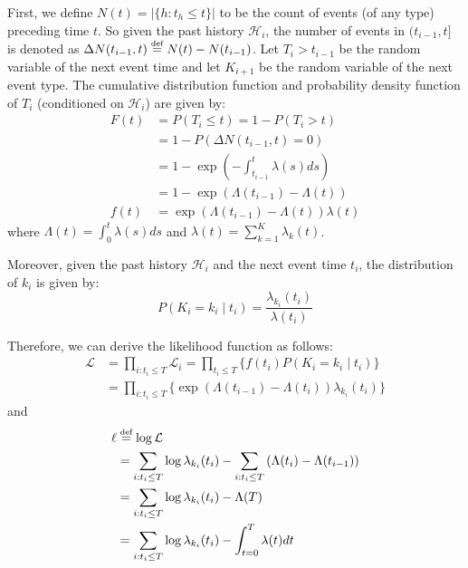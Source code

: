 \documentclass{article}
\newcommand{\defeq}{\mathrel{\stackrel{\mbox{\tiny def}}{=}}} %
\begin{document}
First, we define $N(t) = |\{h: t_h \leq t\}|$ to be the count of events (of any type) preceding time $t$. So given the past history $\mathcal{H}_i$, the number of events in $(t_{i-1},t]$ is denoted as $\Delta N(t_{i-1},t) \defeq N(t)-N(t_{i-1})$.  Let $T_i > t_{i-1}$ be the random variable of the next event time and let $K_{i+1}$ be the random variable of the next event type.  The cumulative distribution function and probability density function of $T_i$ (conditioned on $\mathcal{H}_i$) are given by:
\begin{subequations} \label{eqn:nonhomo_F}
\begin{align}
	F(t)
	&= P(T_i \leq t) = 1-P(T_i > t) \\
	&= 1- P(\Delta N(t_{i-1},t)=0) \\
	&= 1- \exp \left( -\int_{t_{i-1}}^{t} \lambda(s) ds \right) \\
	&= 1- \exp \left( \Lambda(t_{i-1}) - \Lambda(t) \right) \\
	f(t)
	&= \exp \left( \Lambda(t_{i-1}) - \Lambda(t) \right) \lambda(t)
\end{align}
\end{subequations}
where \mbox{$\Lambda(t)=\int_{0}^{t} \lambda(s)ds$} and \mbox{$\lambda(t)=\sum_{k=1}^K \lambda_k(t)$}.

Moreover, given the past history $\mathcal{H}_i$ and the next event time $t_i$, the distribution of $k_i$ is given by:
\begin{equation}
    P(K_i=k_i \mid t_i) = \frac{\lambda_{k_i} (t_i)}{\lambda(t_i)}
\end{equation}

Therefore, we can derive the likelihood function as follows:
\begin{subequations} \label{eqn:likelihood_nonhomo}
\begin{align}
    \mathcal{L}
    &= \prod_{i: t_i\leq T}{\mathcal{L}_i} = \prod_{t_i\leq T}\{{f(t_i ) P(K_i=k_i \mid t_i)} \} \\
    &= \prod_{i: t_i\leq T} \{ \exp \left( \Lambda(t_{i-1}) - \Lambda(t_i) \right) \lambda_{k_i}(t_i) \}
\end{align}
\end{subequations}
and
\begin{subequations} \label{eqn:log-likelihood_nohomo}
\begin{align}
    \ell
    &\defeq \log \mathcal{L} \\
    &= \sum_{i: t_i\leq T} \log \lambda_{k_i}(t_i) - \sum_{i:t_i\leq T} \left( \Lambda(t_i)-\Lambda(t_{i-1}) \right) \\
    &= \sum_{i: t_i\leq T} \log \lambda_{k_i}(t_i) - \Lambda(T) \\
    &= \sum_{i: t_i\leq T} \log \lambda_{k_i}(t_i) - \int_{t=0}^{T} \lambda(t) dt
\end{align}
\end{subequations}
\end{document}
